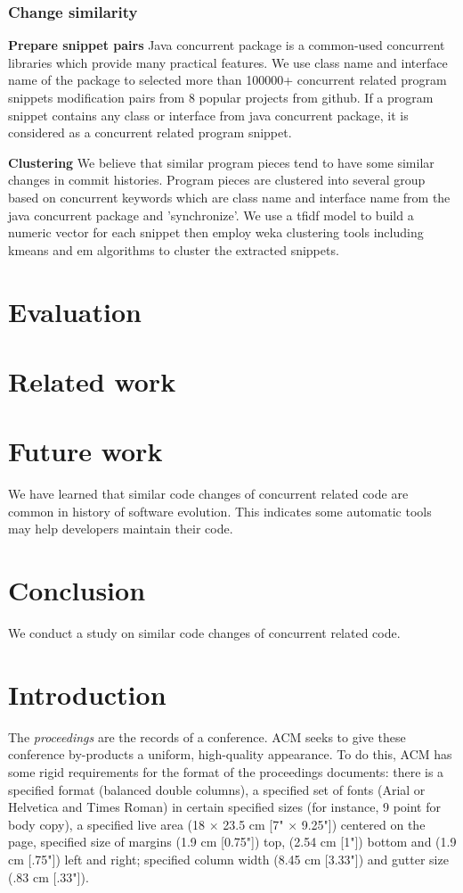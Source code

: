 \documentclass{sig-alternate-05-2015}
\begin{document}
\subsubsection{Change similarity}

\textbf{Prepare snippet pairs}
Java concurrent package is a common-used concurrent libraries which provide many practical features. We use class name and interface name of the package to selected more than 100000+ concurrent related program snippets modification pairs from 8 popular projects from github. If a program snippet contains any class or interface from java concurrent package, it is considered as a concurrent related program snippet.

\textbf{Clustering}
We believe that similar program pieces tend to have some similar changes in commit histories. Program pieces are clustered into several group based on concurrent keywords which are class name and interface name from the java concurrent package and 'synchronize'. We use a tfidf model to build a numeric vector for each snippet then employ weka clustering tools including kmeans and em algorithms to cluster the extracted snippets.

\section{Evaluation}

\section{Related work}

\section{Future work}
We have learned that similar code changes of concurrent related code are common in history of software evolution. This indicates some automatic tools may help developers maintain their code. 
\section{Conclusion}
We conduct a study on similar code changes of concurrent related code.

\section{Introduction}

The \textit{proceedings} are the records of a conference.
ACM seeks to give these conference by-products a uniform,
high-quality appearance.  To do this, ACM has some rigid
requirements for the format of the proceedings documents: there
is a specified format (balanced  double columns), a specified
set of fonts (Arial or Helvetica and Times Roman) in
certain specified sizes (for instance, 9 point for body copy),
a specified live area (18 $\times$ 23.5 cm [7" $\times$ 9.25"]) centered on
the page, specified size of margins (1.9 cm [0.75"]) top, (2.54 cm [1"]) bottom
and (1.9 cm [.75"]) left and right; specified column width
(8.45 cm [3.33"]) and gutter size (.83 cm [.33"]).
\end{document}
